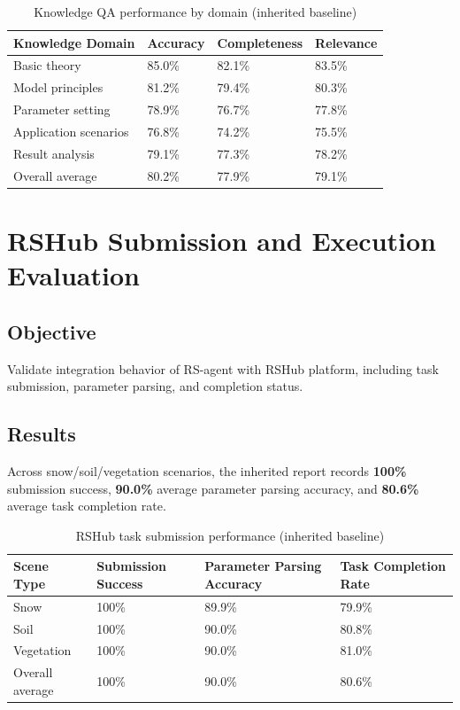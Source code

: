 \begin{table}[htbp]
	\centering
	\caption{Knowledge QA performance by domain (inherited baseline)}
	\label{tab:qa-eval}
	\begin{tabular}{llll}
		\hline
		Knowledge Domain & Accuracy & Completeness & Relevance \\
		\hline
		Basic theory & 85.0\% & 82.1\% & 83.5\% \\
		Model principles & 81.2\% & 79.4\% & 80.3\% \\
		Parameter setting & 78.9\% & 76.7\% & 77.8\% \\
		Application scenarios & 76.8\% & 74.2\% & 75.5\% \\
		Result analysis & 79.1\% & 77.3\% & 78.2\% \\
		Overall average & 80.2\% & 77.9\% & 79.1\% \\
		\hline
	\end{tabular}
\end{table}

\section{RSHub Submission and Execution Evaluation}
\label{sec:test-submit}

\subsection{Objective}
Validate integration behavior of RS-agent with RSHub platform, including task submission, parameter parsing, and completion status.

\subsection{Results}
Across snow/soil/vegetation scenarios, the inherited report records \textbf{100\%} submission success, \textbf{90.0\%} average parameter parsing accuracy, and \textbf{80.6\%} average task completion rate.

\begin{table}[htbp]
	\centering
	\caption{RSHub task submission performance (inherited baseline)}
	\label{tab:submit-eval}
	\begin{tabular}{llll}
		\hline
		Scene Type & Submission Success & Parameter Parsing Accuracy & Task Completion Rate \\
		\hline
		Snow & 100\% & 89.9\% & 79.9\% \\
		Soil & 100\% & 90.0\% & 80.8\% \\
		Vegetation & 100\% & 90.0\% & 81.0\% \\
		Overall average & 100\% & 90.0\% & 80.6\% \\
		\hline
	\end{tabular}
\end{table}

